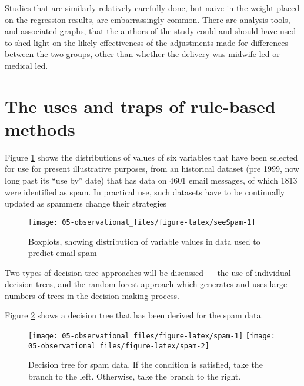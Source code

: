 \documentclass[
  10ptls,
  b5paper]{book}
\begin{document}
Studies that are similarly relatively carefully done, but naive in the weight placed on the regression results, are embarrassingly common. There are analysis tools, and associated graphs, that the authors of the study could and should have used to shed light on the likely effectiveness of the adjustments made for differences between the two groups, other than whether the delivery was midwife led or medical led.

\hypertarget{the-uses-and-traps-of-rule-based-methods}{%
\section{The uses and traps of rule-based methods}\label{the-uses-and-traps-of-rule-based-methods}}

Figure \ref{fig:seeSpam} shows the distributions of values of six variables that have been selected for use for present illustrative purposes, from an historical dataset (pre 1999, now long past its ``use by'' date) that has data on 4601 email messages, of which 1813 were identified as spam. In practical use, such datasets have to be continually updated as spammers change their strategies

\begin{figure}[H]

{\centering \texttt{[image: 05-observational\_files/figure-latex/seeSpam-1]} 

}

\caption{Boxplots, showing distribution of variable values
               in data used to predict email spam}\label{fig:seeSpam}
\end{figure}

Two types of decision tree approaches will be discussed --- the use of individual decision trees, and the random forest approach which generates and uses large numbers of trees in the decision making process.

Figure \ref{fig:spam} shows a decision tree that has been derived for the spam data.

\begin{figure}[H]

{\centering \texttt{[image: 05-observational\_files/figure-latex/spam-1]} \texttt{[image: 05-observational\_files/figure-latex/spam-2]} 

}

\caption{Decision tree for spam data. If the condition is satisfied, take
               the branch to the left.  Otherwise, take the branch to the right.}\label{fig:spam}
\end{figure}
\end{document}
